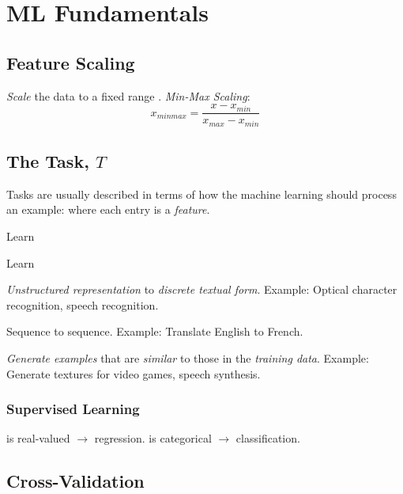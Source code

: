 \documentclass[
	exam={Midterm}
]{cs584exam}
\begin{document}
\setcounter{chapter}{0}
\chapter{ML Fundamentals}\label{ch:ml-fundamentals}
\section{Feature Scaling}\label{sec:feature-scaling}
\emph{Scale} the data to a fixed range \data{$[0, 1]$}.
\emph{Min-Max Scaling}:
\begin{equation}
	x_{minmax} = \frac{x - x_{min}}{x_{max} - x_{min}}
	\label{eq:min-max-scaling}
\end{equation}

\section{The Task, $T$}\label{sec:the-task}
Tasks are usually described in terms of how the machine learning should process an example:  where each entry  is a \emph{feature}.
\begin{description}[font=\color{emphblue}]
	\item[Classification:] Learn 
	\item[Regression:] Learn 
	\item[Transcription:] \emph{Unstructured representation} to \emph{discrete textual form}. Example: Optical character recognition, speech recognition.
	\item[Machine translation:] Sequence to sequence. Example: Translate English to French.
	\item[Synthesis and sampling:] \emph{Generate examples} that are \emph{similar} to those in the \emph{training data}. Example: Generate textures for video games, speech synthesis.
\end{description}

\subsection{Supervised Learning}\label{subsec:supervised-learning}
 is real-valued $\rightarrow$ regression.
 is categorical $\rightarrow$ classification.

\section{Cross-Validation}\label{sec:cross-validation}
\end{document}
